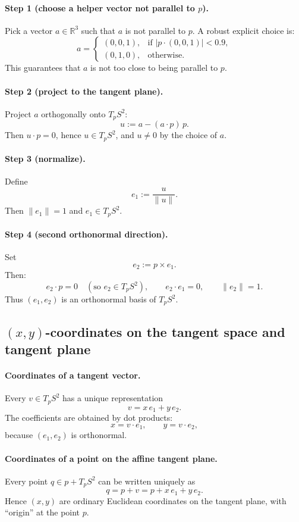 \documentclass[12pt,a4paper]{article}
\theoremstyle{plain}
\theoremstyle{definition}      %
\begin{document}
	\paragraph{Step 1 (choose a helper vector not parallel to $p$).}
	Pick a vector $a\in\mathbb{R}^3$ such that $a$ is not parallel to $p$.
	A robust explicit choice is:
	\[
	a=
	\begin{cases}
		(0,0,1), & \text{if } |p\cdot(0,0,1)|<0.9,\\
		(0,1,0), & \text{otherwise}.
	\end{cases}
	\]
	This guarantees that $a$ is not too close to being parallel to $p$.
	
	\paragraph{Step 2 (project to the tangent plane).}
	Project $a$ orthogonally onto $T_pS^2$:
	\[
	u := a - (a\cdot p)\,p.
	\]
	Then $u\cdot p=0$, hence $u\in T_pS^2$, and $u\neq 0$ by the choice of $a$.
	
	\paragraph{Step 3 (normalize).}
	Define
	\[
	e_1 := \frac{u}{\|u\|}.
	\]
	Then $\|e_1\|=1$ and $e_1\in T_pS^2$.
	
	\paragraph{Step 4 (second orthonormal direction).}
	Set
	\[
	e_2 := p\times e_1.
	\]
	Then:
	\[
	e_2\cdot p=0\quad(\text{so }e_2\in T_pS^2),\qquad
	e_2\cdot e_1=0,\qquad
	\|e_2\|=1.
	\]
	Thus $(e_1,e_2)$ is an orthonormal basis of $T_pS^2$.
	
	\subsection*{$(x,y)$-coordinates on the tangent space and tangent plane}
	
	\paragraph{Coordinates of a tangent vector.}
	Every $v\in T_pS^2$ has a unique representation
	\[
	v = x\,e_1 + y\,e_2.
	\]
	The coefficients are obtained by dot products:
	\[
	x = v\cdot e_1,\qquad y = v\cdot e_2,
	\]
	because $(e_1,e_2)$ is orthonormal.
	
	\paragraph{Coordinates of a point on the affine tangent plane.}
	Every point $q\in p+T_pS^2$ can be written uniquely as
	\[
	q = p + v = p + x\,e_1 + y\,e_2.
	\]
	Hence $(x,y)$ are ordinary Euclidean coordinates on the tangent plane, with ``origin'' at the point $p$.
	
\end{document}
